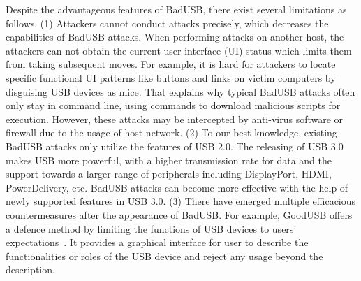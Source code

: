 Despite the advantageous features of BadUSB, there exist several limitations as follows.
(1) Attackers cannot conduct attacks precisely, which decreases the capabilities of BadUSB attacks.
When performing attacks on another host, the attackers can not obtain the current user interface (UI) status which limits them from taking subsequent moves.
For example, it is hard for attackers to locate specific functional UI patterns like buttons and links on victim computers by disguising USB devices as mice.
That explains why typical BadUSB attacks often only stay in command line, using commands to download malicious scripts for execution.
However, these attacks may be intercepted by anti-virus software or firewall due to the usage of host network.
(2) To our best knowledge, existing BadUSB attacks only utilize the features of USB 2.0.
The releasing of USB 3.0 makes USB more powerful, with a higher transmission rate for data and the support towards a larger range of peripherals including DisplayPort, HDMI, PowerDelivery, etc.
BadUSB attacks can become more effective with the help of newly supported features in USB 3.0.
(3) There have emerged multiple efficacious countermeasures after the appearance of BadUSB.
For example, GoodUSB offers a defence method by limiting the functions of USB devices to users' expectations~\cite{tian2015defending}.
It provides a graphical interface for user to describe the functionalities or roles of the USB device and reject any usage beyond the description.

